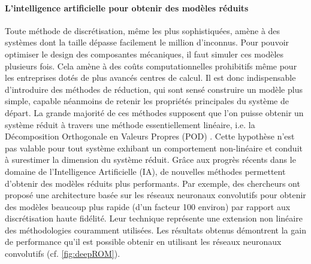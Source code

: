 \documentclass[12pt, french]{article}
\begin{document}
\paragraph{\large L'intelligence artificielle pour obtenir des modèles réduits\\}
Toute méthode de discrétisation, même les plus sophistiquées, amène à des systèmes dont la taille dépasse facilement le million d'inconnus. Pour pouvoir optimiser le design des composantes mécaniques, il faut simuler ces modèles plusieurs fois. Cela amène à des coûts computationnelles prohibitifs même pour les entreprises dotés de plus avancés centres de calcul. Il est donc indispensable d'introduire des méthodes de réduction, qui sont sensé construire un modèle plus simple, capable néanmoins de retenir les propriétés principales du système de départ. La grande majorité de ces méthodes supposent que l'on puisse obtenir un système réduit à travers une méthode essentiellement linéaire, i.e. la Décomposition Orthogonale en Valeurs Propres (POD) \cite{shinde2019,tello2020fluid}. Cette hypothèse n'est pas valable pour tout système exhibant un comportement non-linéaire et conduit à surestimer la dimension du système réduit. Grâce aux progrès récents dans le domaine de l'Intelligence Artificielle (IA), de nouvelles méthodes permettent d'obtenir des modèles réduits plus performants. Par exemple, des chercheurs ont proposé une architecture basée sur les réseaux neuronaux convolutifs \cite{lee2020} pour obtenir des modèles beaucoup plus rapide (d'un facteur 100 environ) par rapport aux discrétisation haute fidélité. Leur technique représente une extension non linéaire des méthodologies couramment utilisées. Les résultats obtenus démontrent la gain de performance qu'il est possible obtenir en utilisant les réseaux neuronaux convolutifs (cf. \ref{fig:deepROM}).
\end{document}
